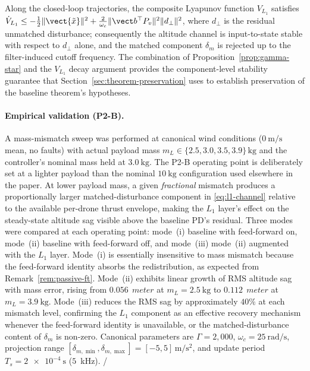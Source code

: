 Along the closed-loop trajectories, the composite Lyapunov function $V_{L_1}$ satisfies $\dot V_{L_1} \le -\tfrac{1}{2}\|\vect{\tilde x}\|^2 + \tfrac{2}{\omega_c}\|\vect b^\top P_v\|^2 \|d_\perp\|^2$, where $d_\perp$ is the residual unmatched disturbance; consequently the altitude channel is input-to-state stable with respect to $d_\perp$ alone, and the matched component $\delta_m$ is rejected up to the filter-induced cutoff frequency. The combination of Proposition~\ref{prop:gamma-star} and the $V_{L_1}$ decay argument provides the component-level stability guarantee that Section~\ref{sec:theorem-preservation} uses to establish preservation of the baseline theorem's hypotheses.

\paragraph{Empirical validation (P2-B).} A mass-mismatch sweep was performed at canonical wind conditions ($\SI{0}{\metre\per\second}$ mean, no faults) with actual payload mass $m_L \in \{2.5, 3.0, 3.5, 3.9\}\,\mathrm{kg}$ and the controller's nominal mass held at $\SI{3.0}{\kilo\gram}$. The P2-B operating point is deliberately set at a lighter payload than the nominal $\SI{10}{\kilo\gram}$ configuration used elsewhere in the paper. At lower payload mass, a given \emph{fractional} mismatch produces a proportionally larger matched-disturbance component in \eqref{eq:l1-channel} relative to the available per-drone thrust envelope, making the $L_1$ layer's effect on the steady-state altitude sag visible above the baseline PD's residual. Three modes were compared at each operating point: mode~(i) baseline with feed-forward on, mode~(ii) baseline with feed-forward off, and mode~(iii) mode~(ii) augmented with the $L_1$ layer. Mode~(i) is essentially insensitive to mass mismatch because the feed-forward identity absorbs the redistribution, as expected from Remark~\ref{rem:passive-ft}. Mode~(ii) exhibits linear growth of RMS altitude sag with mass error, rising from $\SI{0.056}{\ meter}$ at $m_L = \SI{2.5}{\kilo\gram}$ to $\SI{0.112}{\ meter}$ at $m_L = \SI{3.9}{\kilo\gram}$. Mode~(iii) reduces the RMS sag by approximately $40\%$ at each mismatch level, confirming the $L_1$ component as an effective recovery mechanism whenever the feed-forward identity is unavailable, or the matched-disturbance content of $\delta_m$ is non-zero. Canonical parameters are $\Gamma = 2{,}000$, $\omega_c = \SI{25}{\radian\per\second}$, projection range $[\delta_{m,\min}, \delta_{m,\max}] = [-5, 5]\,\mathrm{m/s^2}$, and update period $T_s = \SI{2e-4}{\second}$ ($5$~kHz). /


